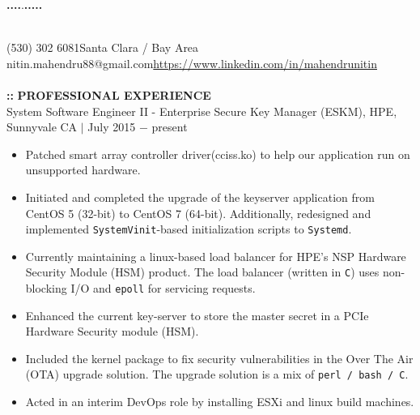 \documentclass[9pt,twosided,a4paper]{scrreprt}
\begin{document}
\sffamily\mdseries\upshape
{}
\textcolor{blue!45!white}{%
\hspace{30pt}\textbf{\huge.}\hspace{30pt}\textbf{\huge.}\hspace{30pt}\textbf{\huge.}\hspace{30pt}\textbf{\huge.}\hspace{30pt}\huge.}\hspace{30pt}\textbf{\huge.}\hspace{30pt}\textbf{\huge.}\hspace{30pt}\textbf{\huge.}\hspace{30pt}\textbf{\huge.}\hspace{30pt}\textbf{\huge.}
%
\colorbox{black!45!white}{
  \begin{minipage}[b][60pt]{180pt}
  \Huge{}
  \end{minipage}
}\\%
\Large (530) 302 6081\hspace{320pt}Santa Clara / Bay Area %
\\%
\Large nitin.mahendru88@gmail.com\hspace{225pt}\href{https://www.linkedin.com/in/mahendrunitin}{https://www.linkedin.com/in/mahendrunitin}
\\\\%
\LARGE \textbf{\color{red}\Huge\hspace{10pt}::} \textbf{PROFESSIONAL EXPERIENCE}\\%
\LARGE System Software Engineer II - Enterprise Secure Key Manager (ESKM), HPE, Sunnyvale CA $|$ July 2015 $-$ present%
\begin{itemize}\itemsep0.4pt \parskip0pt %
\Large\item Patched smart array controller driver(cciss.ko) to help our application run on unsupported hardware.
\Large\item Initiated and completed the upgrade of the keyserver application from CentOS 5 (32-bit) to CentOS 7 (64-bit). Additionally, redesigned and implemented \texttt{SystemVinit}-based initialization scripts to \texttt{Systemd}. 
\Large\item Currently maintaining a linux-based load balancer for HPE's NSP Hardware Security Module (HSM) product. The load balancer (written in \texttt{C}) uses non-blocking I/O and \texttt{epoll} for servicing requests.
\Large\item Enhanced the current key-server to store the master secret in a PCIe Hardware Security module (HSM). 
\Large\item Included the kernel package to fix security vulnerabilities in the Over The Air (OTA) upgrade solution. The upgrade solution is a mix of \texttt{perl / bash / C}.
\Large\item Acted in an interim DevOps role by installing ESXi and linux build machines.\\%
\end{itemize}
\end{document}
